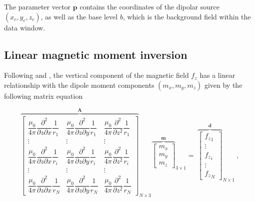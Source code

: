 \documentclass[onecolumn,12pt,a4paper]{article}
\begin{document}
    \noindent
    The parameter vector $\mathbf{p}$ contains the coordinates of the dipolar source $(x_c, y_c, z_c)$, as well as the base level $b$, which is the background field within the data window.

\subsection{Linear magnetic moment inversion}

     Following \citet{Oliveira2015Estimation} and \citet{Souza-Junior2024}, the vertical component of the magnetic field $f_z$ has a linear relationship with the dipole moment components $(m_x, m_y, m_z)$ given by the following matrix equation

     \begin{equation}
    \label{eq_dipole_bz}
    {\overbrace{\begin{bmatrix}
    \dfrac{\mu_0}{4\pi} \dfrac{\partial^2}{\partial z \partial x} \dfrac{1}{r_1}
    & \dfrac{\mu_0}{4\pi} \dfrac{\partial^2}{\partial z \partial y} \dfrac{1}{r_1}
    & \dfrac{\mu_0}{4\pi} \dfrac{\partial^2}{\partial z^2} \dfrac{1}{r_1}
    \\
    \vdots & \vdots & \vdots
    \\
    \dfrac{\mu_0}{4\pi} \dfrac{\partial^2}{\partial z \partial x} \dfrac{1}{r_i}
    & \dfrac{\mu_0}{4\pi} \dfrac{\partial^2}{\partial z \partial y} \dfrac{1}{r_i}
    & \dfrac{\mu_0}{4\pi} \dfrac{\partial^2}{\partial z^2} \dfrac{1}{r_i}
    \\
    \vdots & \vdots & \vdots
    \\
    \dfrac{\mu_0}{4\pi} \dfrac{\partial^2}{\partial z \partial x} \dfrac{1}{r_N}
    & \dfrac{\mu_0}{4\pi} \dfrac{\partial^2}{\partial z \partial y} \dfrac{1}{r_N}
    & \dfrac{\mu_0}{4\pi} \dfrac{\partial^2}{\partial z^2} \dfrac{1}{r_N}
    \end{bmatrix}}^{\mathbf{A}}}_{N \times 3}
    {\overbrace{{\begin{bmatrix}
    m_x \\ m_y \\ m_z
    \end{bmatrix}}}^{\mathbf{m}}}_{3 \times 1}
    =
    ~{\overbrace{\begin{bmatrix}
    {f_z}_1
    \\
    \vdots
    \\
    {f_z}_i
    \\
    \vdots
    \\
    {f_z}_N
    \end{bmatrix}}^{\mathbf{d}}}_{N \times 1}
    \ ,
    \end{equation}
\end{document}
